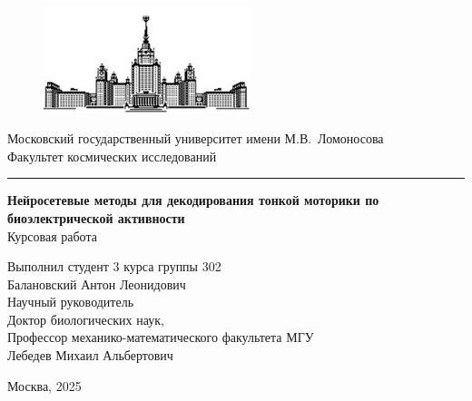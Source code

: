 \documentclass[12pt,a4paper]{article}
\begin{document}
\begin{titlepage}

	 \vspace{-0.7 in}
	\begin{center}
		\begin{figure}[h!]
			\centering
			\includegraphics[width = 6cm, height = 4 cm]{msu.jpg}
			\label{fig:msu}
		\end{figure}
		\normalsize{{Московский  государственный
				университет имени М.В.~Ломоносова}}\\[0.1cm]
		\normalsize{{Факультет космических исследований}}\\[0.1 cm]
		\noindent\rule{16cm}{0.4pt}
		\vfill
	
		\hfill \break
		\textbf{\Large{Нейросетевые методы для декодирования тонкой моторики по биоэлектрической активности}}\\ [0.3cm]
        \normalsize{{Курсовая работа}}\\
		\vfill
		\normalsize
		\begin{flushright}
			Выполнил студент 3 курса группы 302\\
			Балановский Антон Леонидович\\[0.3cm]
			
			 
			
			Научный руководитель\\
			Доктор биологических наук,\\
            Профессор механико-математического факультета МГУ\\
            Лебедев Михаил Альбертович\\

			
		\end{flushright}
		\hfill \break
	\end{center}
	
	\vfill
	\begin{center}{Москва, 2025}\end{center}
	\thispagestyle{empty} 
\end{titlepage}
\tableofcontents
\end{document}
